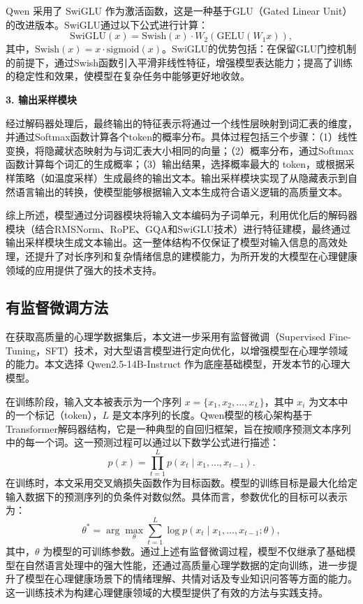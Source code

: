 Qwen 采用了 SwiGLU\cite{Shazeer_2020} 作为激活函数，这是一种基于GLU（Gated Linear Unit）的改进版本。SwiGLU通过以下公式进行计算：
\begin{equation}
  \text{SwiGLU}(x) = \text{Swish}(x) \cdot W_2 ( \text{GELU}(W_1 x) ),
\end{equation}
其中，$\text{Swish}(x) = x \cdot \text{sigmoid}(x)$。SwiGLU的优势包括：在保留GLU门控机制的前提下，通过Swish函数引入平滑非线性特征，增强模型表达能力；提高了训练的稳定性和效果，使模型在复杂任务中能够更好地收敛。

\textbf{3. 输出采样模块}

经过解码器处理后，最终输出的特征表示将通过一个线性层映射到词汇表的维度，并通过Softmax函数计算各个token的概率分布。具体过程包括三个步骤：（1）线性变换，将隐藏状态映射为与词汇表大小相同的向量；（2）概率分布，通过Softmax函数计算每个词汇的生成概率；（3）输出结果，选择概率最大的 token，或根据采样策略（如温度采样）生成最终的输出文本。输出采样模块实现了从隐藏表示到自然语言输出的转换，使模型能够根据输入文本生成符合语义逻辑的高质量文本。

\vspace{1em}

综上所述，模型通过分词器模块将输入文本编码为子词单元，利用优化后的解码器模块（结合RMSNorm、RoPE、GQA和SwiGLU技术）进行特征建模，最终通过输出采样模块生成文本输出。这一整体结构不仅保证了模型对输入信息的高效处理，还提升了对长序列和复杂情绪信息的建模能力，为所开发的大模型在心理健康领域的应用提供了强大的技术支持。

\subsection{有监督微调方法}

在获取高质量的心理学数据集后，本文进一步采用有监督微调（Supervised Fine-Tuning，SFT）技术，对大型语言模型进行定向优化，以增强模型在心理学领域的能力。本文选择 Qwen2.5-14B-Instruct 作为底座基础模型，开发本节的心理大模型。

在训练阶段，输入文本被表示为一个序列 $x = \{x_1, x_2, ..., x_L\}$，其中 $x_i$ 为文本中的一个标记（token），$L$ 是文本序列的长度。Qwen模型的核心架构基于Transformer解码器结构，它是一种典型的自回归框架，旨在按顺序预测文本序列中的每一个词。这一预测过程可以通过以下数学公式进行描述：
\begin{equation}
  p(x) = \prod_{t=1}^{L} p(x_t \mid x_1, ..., x_{t-1}).
\end{equation}
在训练时，本文采用交叉熵损失函数作为目标函数。模型的训练目标是最大化给定输入数据下的预测序列的负条件对数似然。具体而言，参数优化的目标可以表示为：
\begin{equation}
  \theta^* = \arg \max_{\theta} \sum_{t=1}^{L} \log p(x_t \mid x_1, ..., x_{t-1}; \theta),
\end{equation}
其中，$\theta$ 为模型的可训练参数。通过上述有监督微调过程，模型不仅继承了基础模型在自然语言处理中的强大性能，还通过高质量心理学数据的定向训练，进一步提升了模型在心理健康场景下的情绪理解、共情对话及专业知识问答等方面的能力。这一训练技术为构建心理健康领域的大模型提供了有效的方法与实践支持。

